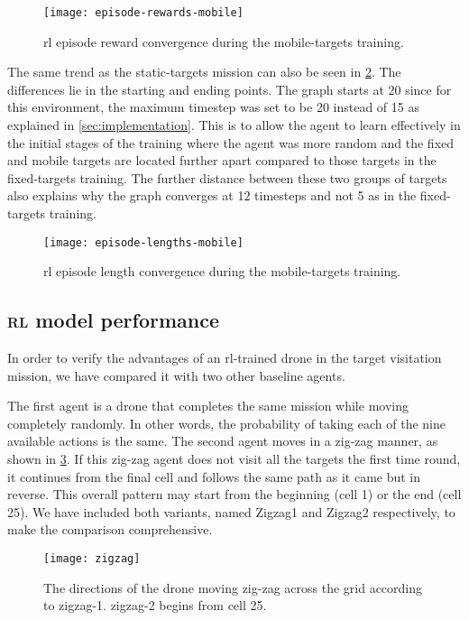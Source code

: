 \documentclass[../main.tex]{subfiles}
\begin{document}
\begin{figure}[!t]
	\centering
	\texttt{[image: episode-rewards-mobile]}
        \caption{\gls{rl} episode reward convergence during the
        mobile-targets training.}
        \label{fig:episode-rewards-mobile}
\end{figure}

The same trend as the static-targets mission can also be seen in
\cref{fig:episode-lengths-mobile}.
The differences lie in the starting and ending points.
The graph starts at 20 since for this environment, the maximum
timestep was set to be 20 instead of 15 as explained in
\cref{sec:implementation}.
This is to allow the agent to learn effectively in the initial
stages of the training where the agent was more random and the fixed
and mobile targets are located further apart compared to those targets
in the fixed-targets training.
The further distance between these two groups of targets also explains
why the graph converges at 12 timesteps and not 5 as in the
fixed-targets training.

\begin{figure}[!t]
	\centering
	\texttt{[image: episode-lengths-mobile]}
        \caption{\gls{rl} episode length convergence during the
        mobile-targets training.}
        \label{fig:episode-lengths-mobile}
\end{figure}

\subsection{\textsc{rl} model performance}

In order to verify the advantages of an \gls{rl}-trained drone
in the target visitation mission, we have compared it with
two other baseline agents.

The first agent is a drone that completes the same mission 
while moving completely randomly. 
In other words, the probability of taking each of the 
nine available actions is the same.
The second agent moves in a zig-zag manner, as shown
in \cref{fig:zigzag}.
If this zig-zag agent does not visit all the targets the first time
round, it continues from the final cell and follows the same
path as it came but in reverse.
This overall pattern may start from the beginning (cell 1) or 
the end (cell 25).
We have included both variants, named Zigzag1 and Zigzag2
respectively, to make the comparison comprehensive.

\begin{figure}[!t]
	\centering
	\texttt{[image: zigzag]}
	\caption{The directions of the drone moving zig-zag
		across the grid according to zigzag-1.
                zigzag-2 begins from cell 25.}
	\label{fig:zigzag}
\end{figure}
\end{document}
